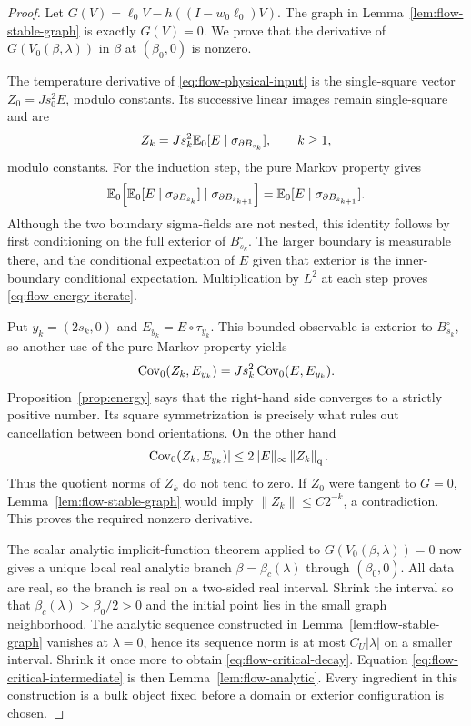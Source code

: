 \begin{proof}
Let \(G(V)=\ell_0V-h((I-w_0\ell_0)V)\).  The graph in
Lemma~\ref{lem:flow-stable-graph} is exactly \(G(V)=0\).  We prove that
the derivative of \(G(V_0(\beta,\lambda))\) in \(\beta\) at
\((\beta_0,0)\) is nonzero.

The temperature derivative of \eqref{eq:flow-physical-input} is the
single-square vector \(Z_0=Js_0^2E\), modulo constants.  Its successive
linear images remain single-square and are
\begin{equation}\label{eq:flow-energy-iterate}
 Z_k=Js_k^2\mathbb E_0[E\mid\sigma_{\partial B_{s_k}}],\qquad k\ge1,
\end{equation}
modulo constants.  For the induction step, the pure Markov property gives
\[
 \mathbb E_0\!\left[\mathbb E_0[E\mid\sigma_{\partial B_{s_k}}]
              \mid\sigma_{\partial B_{s_{k+1}}}\right]
 =\mathbb E_0[E\mid\sigma_{\partial B_{s_{k+1}}}].
\]
Although the two boundary sigma-fields are not nested, this identity
follows by first conditioning on the full exterior of \(B_{s_k}^\circ\).
The larger boundary is measurable there, and the conditional expectation
of \(E\) given that exterior is the inner-boundary conditional expectation.
Multiplication by \(L^2\) at each step proves
\eqref{eq:flow-energy-iterate}.

Put \(y_k=(2s_k,0)\) and \(E_{y_k}=E\circ\tau_{y_k}\).  This bounded
observable is exterior to \(B_{s_k}^\circ\), so another use of the pure
Markov property yields
\begin{equation}\label{eq:flow-energy-test}
 \operatorname{Cov}_0(Z_k,E_{y_k})
 =Js_k^2\operatorname{Cov}_0(E,E_{y_k}).
\end{equation}
Proposition~\ref{prop:energy} says that the right-hand side converges to
a strictly positive number.  Its square symmetrization is precisely what
rules out cancellation between bond orientations.  On the other hand
\[
 |\operatorname{Cov}_0(Z_k,E_{y_k})|
 \le 2\|E\|_\infty\left\|Z_k\right\|_{\mathrm q}.
\]
Thus the quotient norms of \(Z_k\) do not tend to zero.  If \(Z_0\)
were tangent to \(G=0\), Lemma~\ref{lem:flow-stable-graph} would imply
\(\|Z_k\|\le C2^{-k}\), a contradiction.  This proves the required
nonzero derivative.

The scalar analytic implicit-function theorem applied to
\(G(V_0(\beta,\lambda))=0\) now gives a unique local real analytic branch
\(\beta=\beta_c(\lambda)\) through \((\beta_0,0)\).  All data are real,
so the branch is real on a two-sided real interval.  Shrink the interval
so that \(\beta_c(\lambda)>\beta_0/2>0\) and the initial point lies in
the small graph neighborhood.  The analytic sequence constructed in
Lemma~\ref{lem:flow-stable-graph} vanishes at \(\lambda=0\), hence its
sequence norm is at most \(C_U|\lambda|\) on a smaller interval.  Shrink
it once more to obtain \eqref{eq:flow-critical-decay}.  Equation
\eqref{eq:flow-critical-intermediate} is then
Lemma~\ref{lem:flow-analytic}.  Every ingredient in this construction is
a bulk object fixed before a domain or exterior configuration is chosen.
\end{proof}

